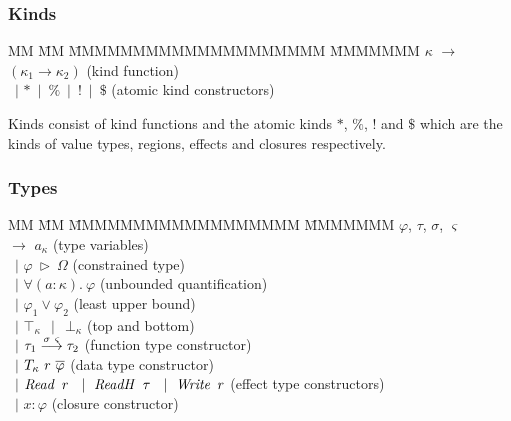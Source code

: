\subsubsection{Kinds}
\vspace{-2ex}
\begin{tabbing}
MM 	\= MM \= MMMMMMMMMMMMMMMMMMMM \= MMMMMMM \kill
$\kappa$ 
	\>   $\to$ 	\> $(\kappa_1 \to \kappa_2)$ 	  				\> (kind function)	\\
 	\> \ $\mid$	\> $* \ \mid \ \% \ \mid \ ! \ \mid \ \$$ 			\> (atomic kind constructors)
\end{tabbing}

Kinds consist of kind functions and the atomic kinds $*$, $\%$, $!$ and $\$$ which are the kinds of value types, regions, effects and closures respectively. 




\clearpage{}
\vspace{-2em}
\subsubsection{Types}
\vspace{-1ex}
\begin{tabbing}
MM 	\= MM \= MMMMMMMMMMMMMMMMMM \= MMMMMMM \kill
$\varphi$, $\tau$, $\sigma$, $\varsigma$	\\
	\> $\to$	\> $a_\kappa$					\> (type variables) \\
	\> \ $\mid$	\> $\varphi \ \rhd \ \Omega$			\> (constrained type) \\
	\> \ $\mid$	\> $\forall (a : \kappa). \ \varphi$		\> (unbounded quantification) \\
	\> \ $\mid$	\> $\varphi_1 \lor \varphi_2$			\> (least upper bound) \\
	\> \ $\mid$	\> $\top_\kappa \ \ \mid  \ \ \bot_\kappa$	\> (top and bottom) \\
	\> \ $\mid$	\> $\tau_1 \stackrel{\sigma \ \varsigma}{\longrightarrow} \tau_2$	\> (function type constructor) \\
	\> \ $\mid$	\> $T_{\kappa} \ r \ \overline{\varphi}$		\> (data type constructor) \\
	\> \ $\mid$	\> $\iRead \ r \ 
				\ \mid \ \iReadH \ \tau \ 
				\ \mid \ \iWrite \ r$ 		\> (effect type constructors) \\
	\> \ $\mid$	\> $x : \varphi$				\> (closure constructor)
\end{tabbing}

